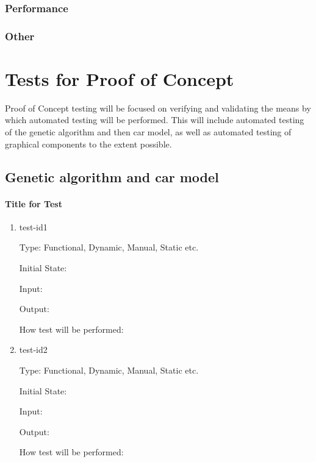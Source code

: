 \documentclass[12pt, titlepage]{article}
\begin{document}
\subsubsection{Performance}

\subsubsection{Other}

\section{Tests for Proof of Concept}

Proof of Concept testing will be focused on verifying and validating the means by which automated testing will be performed. This will include automated testing of the genetic algorithm and then car model, as well as automated testing of graphical components to the extent possible.

\subsection{Genetic algorithm and car model}
		
\paragraph{Title for Test}

\begin{enumerate}

\item{test-id1\\}

Type: Functional, Dynamic, Manual, Static etc.
					
Initial State: 
					
Input: 
					
Output: 
					
How test will be performed: 
					
\item{test-id2\\}

Type: Functional, Dynamic, Manual, Static etc.
					
Initial State: 
					
Input: 
					
Output: 
					
How test will be performed: 

\end{enumerate}
\end{document}
